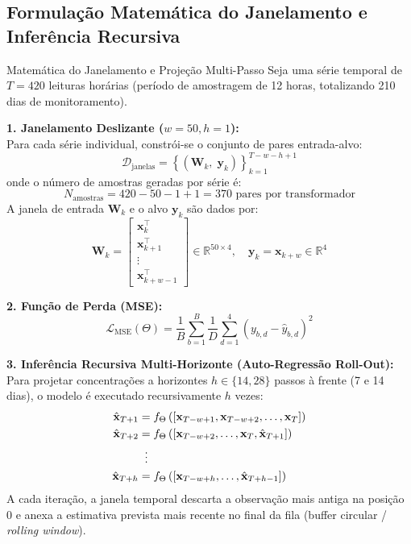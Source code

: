 \documentclass[11pt,a4paper]{article}
\begin{document}
\subsection{Formulação Matemática do Janelamento e Inferência Recursiva}
\begin{mathBox}{Matemática do Janelamento e Projeção Multi-Passo}
Seja uma série temporal de $T = 420$ leituras horárias (período de amostragem de 12 horas, totalizando 210 dias de monitoramento).

\textbf{1. Janelamento Deslizante ($w=50, h=1$):}\\
Para cada série individual, constrói-se o conjunto de pares entrada-alvo:
\begin{equation}
  \mathcal{D}_{\text{janelas}} = \left\{ \left( \mathbf{W}_k, \; \mathbf{y}_k \right) \right\}_{k=1}^{T - w - h + 1}
\end{equation}
onde o número de amostras geradas por série é:
\begin{equation}
  N_{\text{amostras}} = 420 - 50 - 1 + 1 = 370 \text{ pares por transformador}
\end{equation}
A janela de entrada $\mathbf{W}_k$ e o alvo $\mathbf{y}_k$ são dados por:
\begin{equation}
  \mathbf{W}_k = \begin{bmatrix} \mathbf{x}_k^\top \\ \mathbf{x}_{k+1}^\top \\ \vdots \\ \mathbf{x}_{k+w-1}^\top \end{bmatrix} \in \mathbb{R}^{50 \times 4}, \quad \mathbf{y}_k = \mathbf{x}_{k+w} \in \mathbb{R}^4
\end{equation}

\textbf{2. Função de Perda (MSE):}
\begin{equation}
  \mathcal{L}_{\text{MSE}}(\Theta) = \frac{1}{B} \sum_{b=1}^B \frac{1}{D} \sum_{d=1}^4 \left( y_{b, d} - \hat{y}_{b, d} \right)^2
\end{equation}

\textbf{3. Inferência Recursiva Multi-Horizonte (Auto-Regressão Roll-Out):}\\
Para projetar concentrações a horizontes $h \in \{14, 28\}$ passos à frente (7 e 14 dias), o modelo é executado recursivamente $h$ vezes:
\begin{align}
  \hat{\mathbf{x}}_{T+1} &= f_\Theta\left( \left[ \mathbf{x}_{T-w+1}, \mathbf{x}_{T-w+2}, \dots, \mathbf{x}_T \right] \right) \\
  \hat{\mathbf{x}}_{T+2} &= f_\Theta\left( \left[ \mathbf{x}_{T-w+2}, \dots, \mathbf{x}_T, \hat{\mathbf{x}}_{T+1} \right] \right) \\
  &\;\;\vdots \notag\\
  \hat{\mathbf{x}}_{T+h} &= f_\Theta\left( \left[ \mathbf{x}_{T-w+h}, \dots, \hat{\mathbf{x}}_{T+h-1} \right] \right)
\end{align}
A cada iteração, a janela temporal descarta a observação mais antiga na posição 0 e anexa a estimativa prevista mais recente no final da fila (buffer circular / \textit{rolling window}).
\end{mathBox}
\end{document}
